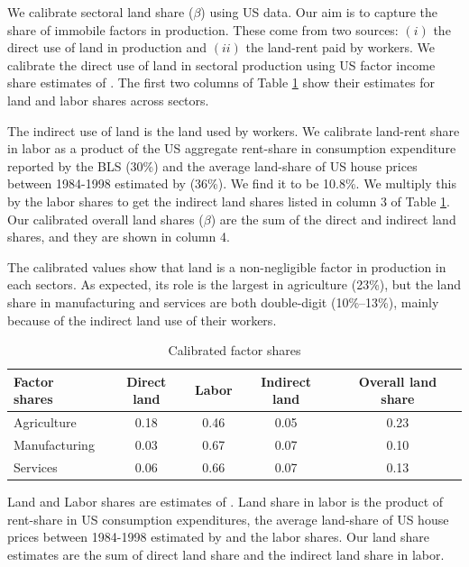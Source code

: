 \documentclass[12pt]{article}
\begin{document}
We calibrate sectoral land share ($\beta$) using US data. Our aim is to capture the share of immobile factors in production. These come from two sources: $(i)$ the direct use of land in production and $(ii)$ the land-rent paid by workers. We calibrate the direct use of land in sectoral production using US factor income share estimates of . The first two columns of Table \ref{tab:Sector_Shares} show their estimates for land and labor shares across sectors.

The indirect use of land is the land used by workers. We calibrate land-rent share in labor as a product of the US aggregate rent-share in consumption expenditure reported by the BLS ($30\%$) and the average land-share of US house prices between 1984-1998 estimated by  (36\%). We find it to be 10.8\%. We multiply this by the labor shares to get the indirect land shares listed in column 3 of Table \ref{tab:Sector_Shares}. Our calibrated overall land shares ($\beta$) are the sum of the direct and indirect land shares, and they are shown in column 4.

The calibrated values show that land is a non-negligible factor in production in each sectors. As expected, its role is the largest in agriculture (23\%), but the land share in manufacturing and services are both double-digit (10\%--13\%), mainly because of the indirect land use of their workers.


\begin{table}[h!]
\caption{Calibrated factor shares\label{tab:Sector_Shares}}
\begin{center}
\begin{tabular}{l|ccc|c}
\toprule
Factor shares & Direct land & Labor & Indirect land & Overall land share \\
\midrule
Agriculture & 0.18 & 0.46  & 0.05 & 0.23 \\
Manufacturing& 0.03 & 0.67 & 0.07 & 0.10  \\
Services    &  0.06 & 0.66 & 0.07 & 0.13 \\
\bottomrule
\end{tabular}
\end{center}

\noindent \footnotesize{Land and Labor shares are estimates of . Land share in labor is the product of rent-share in US consumption expenditures, the average land-share of US house prices between 1984-1998 estimated by  and the labor shares. Our land share estimates are the sum of direct land share and the indirect land share in labor.}
\end{table}
\end{document}
